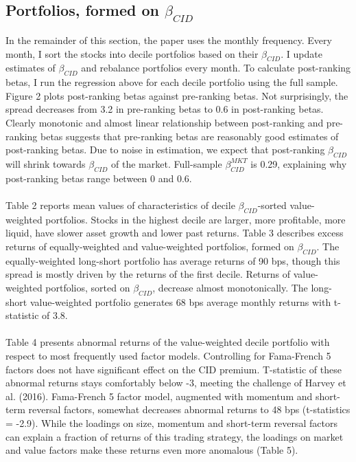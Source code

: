 \documentclass[12pt]{article}
\begin{document}
\subsection{Portfolios, formed on $\beta_{CID}$}

In the remainder of this section, the paper uses the monthly frequency. Every month, I sort the stocks into decile portfolios based on their $\beta_{CID}$. I update estimates of $\beta_{CID}$ and rebalance portfolios every month. To calculate post-ranking betas, I run the  regression above for each decile portfolio using the full sample. Figure 2 plots post-ranking betas against pre-ranking betas. Not surprisingly, the spread decreases from 3.2 in pre-ranking betas to 0.6 in post-ranking betas. Clearly monotonic and almost linear relationship between post-ranking and pre-ranking betas suggests that pre-ranking betas are reasonably good estimates of post-ranking betas. Due to noise in estimation, we expect that post-ranking $\beta_{CID}$ will shrink towards $\beta_{CID}$ of the market. Full-sample $\beta^{MKT}_{CID}$ is 0.29, explaining why post-ranking betas range between 0 and 0.6.
\paragraph{}
Table 2 reports mean values of characteristics of decile $\beta_{CID}$-sorted value-weighted portfolios. Stocks in the highest decile are larger, more profitable, more liquid, have slower asset growth and lower past returns. Table 3 describes excess returns of equally-weighted and value-weighted portfolios, formed on $\beta_{CID}$. The equally-weighted long-short portfolio has average returns of 90 bps, though this spread is mostly driven by the returns of the first decile. Returns of value-weighted portfolios, sorted on $\beta_{CID}$, decrease almost monotonically. The long-short value-weighted portfolio generates 68 bps average monthly returns with t-statistic of 3.8. 
\paragraph{}
Table 4 presents abnormal returns of the value-weighted decile portfolio with respect to most frequently used factor models. Controlling for Fama-French 5 factors does not have significant effect on the CID premium. T-statistic of these abnormal returns stays comfortably below -3, meeting the challenge of Harvey et al. (2016). Fama-French 5 factor model, augmented with momentum and short-term reversal factors, somewhat decreases abnormal returns to 48 bps (t-statistics = -2.9). While the loadings on size, momentum and short-term reversal factors can explain a fraction of returns of this trading strategy, the loadings on market and value factors make these returns even more anomalous (Table 5).
\end{document}
